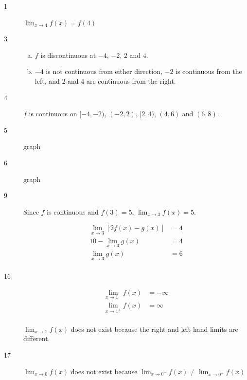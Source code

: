 \documentclass[letterpaper, landscape]{exam}
\begin{document}
    \begin{description}

      \item[1] $\lim_{x \to 4} f(x) = f(4)$

      \item[3] 
        \begin{enumerate}[(a)]
          \item $f$ is discontinuous at $-4$, $-2$, $2$ and $4$. 

          \item $-4$ is not continuous from either direction, $-2$ is continuous from the
            left, and $2$ and $4$ are continuous from the right.

        \end{enumerate}

      \item[4] $f$ is continuous on $[-4, -2)$, $(-2, 2)$, $[2, 4)$, $(4, 6)$ 
          and $(6, 8)$.

      \item[5] graph

      \item[6] graph

      \item[9] Since $f$ is continuous and $f(3) = 5$, $\lim_{x \to 3} f(x) = 5$.

        \begin{align*}
          \lim_{x \to 3} \left[ 2 f(x) - g(x) \right] & = 4 \\
          10 - \lim_{x \to 3} g(x)                    & = 4 \\
          \lim_{x \to 3} g(x)                         & = \boxed{ 6 } \\
        \end{align*}

      \item[16] 
        \begin{align*}
          \lim_{x \to 1^-} f(x) & = - \infty \\
          \lim_{x \to 1^+} f(x) & = \infty \\
        \end{align*}

        $\lim_{x \to 1} f(x)$ does not exist because the right and left hand limits are
        different.

      \item[17] 
        $\lim_{x \to 0} f(x)$ does not exist because 
        $\lim_{x \to 0^-} f(x) \neq \lim_{x \to 0^+} f(x)$


\end{description}
\end{document}
